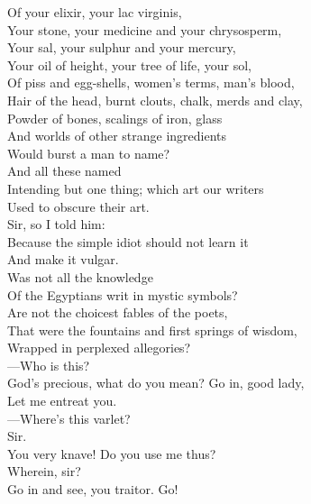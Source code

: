 \documentclass[a4paper,oneside,12pt]{memoir}
\begin{document}
\begin{drama*}
Of your elixir, your lac virginis,\\
Your stone, your medicine and your chrysosperm,\\
Your sal, your sulphur and your mercury,\\
Your oil of height, your tree of life, your sol,\\
Of piss and egg-shells, women's terms, man's blood,\\
Hair of the head, burnt clouts, chalk, merds and clay,\\
Powder of bones, scalings of iron, glass\\
And worlds of other strange ingredients\\
Would burst a man to name?\\
\subtlespeaks {} And all these named\\
Intending but one thing; which art our writers\\
Used to obscure their art.\\
\mammonspeaks {} Sir, so I told him:\\
Because the simple idiot should not learn it\\
And make it vulgar.\\
\subtlespeaks {} Was not all the knowledge\\
Of the Egyptians writ in mystic symbols?\\
Are not the choicest fables of the poets,\\
That were the fountains and first springs of wisdom,\\
Wrapped in perplexed allegories?\\
\mammonspeaks {} ---Who is this?\\
\subtlespeaks God's precious, what do you mean? Go in, good lady,\\
Let me entreat you.\\
 ---Where's this varlet?\\
\facespeaks {} Sir.\\
\subtlespeaks You very knave! Do you use me thus?\\
\facespeaks {} Wherein, sir?\\
\subtlespeaks Go in and see, you traitor. Go!\\

\end{drama*}
\end{document}
